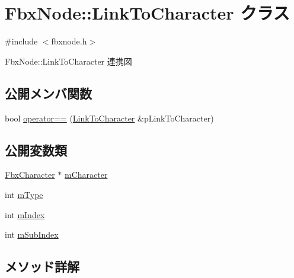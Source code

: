 \hypertarget{class_fbx_node_1_1_link_to_character}{}\section{Fbx\+Node\+:\+:Link\+To\+Character クラス}
\label{class_fbx_node_1_1_link_to_character}


{\ttfamily \#include $<$fbxnode.\+h$>$}



Fbx\+Node\+:\+:Link\+To\+Character 連携図
\subsection*{公開メンバ関数}
\begin{DoxyCompactItemize}
\item 
bool \hyperlink{class_fbx_node_1_1_link_to_character_a7a05beb9afe0aa5367743a011a3e1182}{operator==} (\hyperlink{class_fbx_node_1_1_link_to_character}{Link\+To\+Character} \&p\+Link\+To\+Character)
\end{DoxyCompactItemize}
\subsection*{公開変数類}
\begin{DoxyCompactItemize}
\item 
\hyperlink{class_fbx_character}{Fbx\+Character} $\ast$ \hyperlink{class_fbx_node_1_1_link_to_character_adc1f08186e1643f6257a39487c7fff1a}{m\+Character}
\item 
int \hyperlink{class_fbx_node_1_1_link_to_character_a2f4f7682807d446a976ec780312043ef}{m\+Type}
\item 
int \hyperlink{class_fbx_node_1_1_link_to_character_a67864508b5c8a7ee952d5d28d46e3853}{m\+Index}
\item 
int \hyperlink{class_fbx_node_1_1_link_to_character_a04cbe50393b9a5822efabf140fe79876}{m\+Sub\+Index}
\end{DoxyCompactItemize}


\subsection{メソッド詳解}
\mbox{\label{class_fbx_node_1_1_link_to_character_a7a05beb9afe0aa5367743a011a3e1182}} 
